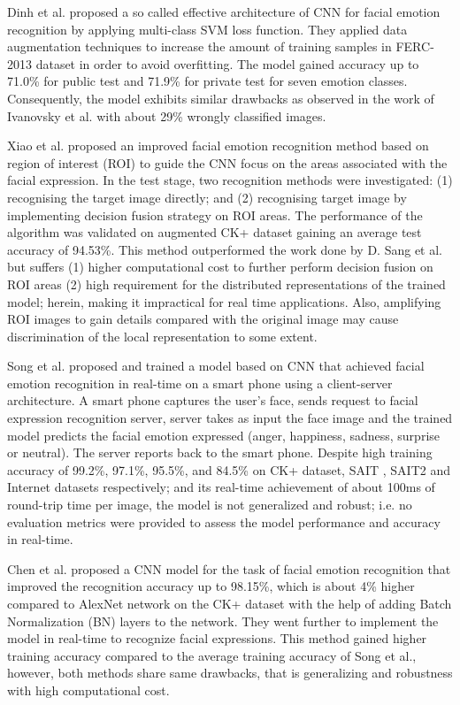 \documentclass[master]{thesis-uestc}
\begin{document}
Dinh et al. proposed a so called effective architecture of CNN for facial emotion recognition by applying multi-class SVM loss function. They applied data augmentation techniques to increase the amount of training samples in FERC-2013 dataset in order to avoid overfitting. The model gained accuracy up to 71.0\% for public test and 71.9\% for private test for seven emotion classes. Consequently, the model exhibits similar drawbacks as observed in the work of Ivanovsky et al. with about 29\% wrongly classified images.

Xiao et al. proposed an improved facial emotion recognition method based on region of interest (ROI) to guide the CNN focus on the areas associated with the facial expression. In the test stage, two recognition methods were investigated: (1) recognising the target image directly; and (2) recognising target image by implementing decision fusion strategy on ROI areas.  The performance of the algorithm was validated on augmented CK+ dataset gaining an average test accuracy of 94.53\%. This method outperformed the work done by D. Sang et al. but suffers (1) higher computational cost to further perform decision fusion on ROI areas (2) high requirement for the distributed representations of the trained model; herein, making it impractical for real time applications. Also, amplifying ROI images to gain details compared with the original image may cause discrimination of the local representation to some extent.

Song et al. proposed and trained a model based on CNN that achieved facial emotion recognition in real-time on a smart phone using a client-server architecture. A smart phone captures the user's face, sends request to facial expression recognition server, server takes as input the face image and the trained model predicts the facial emotion expressed (anger, happiness, sadness, surprise or neutral). The server reports back to the smart phone. Despite high training accuracy of 99.2\%, 97.1\%, 95.5\%, and 84.5\% on CK+ dataset, SAIT , SAIT2  and Internet  datasets respectively; and its real-time achievement of about 100ms of round-trip time per image, the model is  not generalized and robust; i.e. no evaluation metrics were provided to assess the model performance and accuracy in real-time.

Chen et al. proposed a CNN model for the task of facial emotion recognition that improved the recognition accuracy up to 98.15\%, which is about 4\% higher compared to AlexNet network on the CK+ dataset with the help of adding Batch Normalization (BN) layers to the network. They went further to implement the model in real-time to recognize facial expressions. This method gained higher training accuracy compared to the average training accuracy of Song et al., however, both methods share same drawbacks, that is generalizing and robustness with high computational cost.
\end{document}
